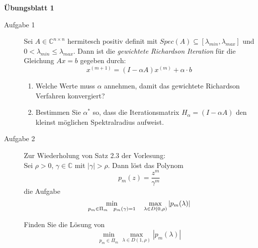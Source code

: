 \documentclass[a4paper,11pt]{scrartcl}
\begin{document}
\aihead

\begin{center}
  {\large\textbf{Übungsblatt 1}}
\end{center}


\begin{description}
    \item[Aufgabe 1] Sei $A \in \mathbb{C}^{n\times n}$ hermitesch positiv definit mit $Spec(A) \subseteq [\lambda_{min},\lambda_{max}]$ und $0 < \lambda_{min} \leq \lambda_{max}$. Dann ist die \textit{gewichtete Richardson Iteration} für die Gleichung $A x = b$ gegeben durch:\\
\begin{equation*}
	x^{(m+1)} = (I - \alpha A)x^{(m)} + \alpha \cdot b
\end{equation*}

\begin{enumerate}
\item Welche Werte muss $\alpha$ annehmen, damit das gewichtete Richardson Verfahren konvergiert?
\item Bestimmen Sie $\alpha^*$ so, dass die Iterationsmatrix $H_\alpha = (I - \alpha A)$ den kleinst möglichen Spektralradius aufweist.
\end{enumerate}

    \item[Aufgabe 2] Zur Wiederholung von Satz 2.3 der Vorlesung:\\
    Sei $\rho > 0$, $\gamma \in \mathbb{C}$ mit $|\gamma| > \rho$. Dann löst das Polynom
    \begin{equation*}
    p_m(z) = \frac{z^m}{\gamma^m}
    \end{equation*}
    die Aufgabe 
    \begin{equation*}
    \min_{p_m\in \Pi_m \text{\quad } p_m(\gamma) = 1}   \quad \max_{\lambda \in D(0, \rho)} |p_m(\lambda)| 
    \end{equation*}

	Finden Sie die Lösung von \\
	    \begin{equation*}
	    \min_{p_m \in \overline{\Pi}_m} \max_{\lambda \in D(1, \rho)} |p_m(\lambda)| 
	    \end{equation*}
\end{description}
\end{document}
